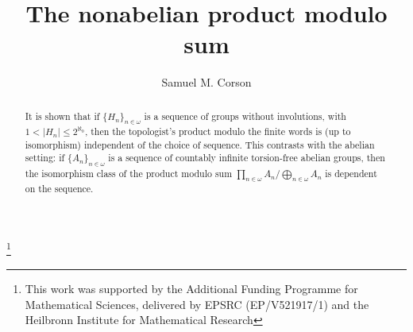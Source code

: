 \documentclass{amsart}
\title{The nonabelian product modulo sum}
\author{Samuel M. Corson}
\theoremstyle{definition}\newtheorem{theorem}{Theorem}
\theoremstyle{definition}\newtheorem*{A}{Main Theorem}
\theoremstyle{definition}\newtheorem*{B}{Theorem \ref{elementaryequiv}}
\theoremstyle{definition}\newtheorem*{C}{Theorem \ref{continuous}}
\theoremstyle{definition}\newtheorem*{D}{Theorem \ref{bigisomorphism2}}
\theoremstyle{definition}\newtheorem{bigtheorem}{Main Theorem}
\numberwithin{theorem}{section}
\theoremstyle{definition}\newtheorem{corollary}[theorem]{Corollary}
\theoremstyle{definition}\newtheorem{proposition}[theorem]{Proposition}
\theoremstyle{definition}\newtheorem{definition}[theorem]{Definition}
\theoremstyle{definition}\newtheorem{question}[theorem]{Question}
\theoremstyle{definition}\newtheorem{example}[theorem]{Example}
\theoremstyle{definition}\newtheorem{remark}[theorem]{Remark}
\theoremstyle{definition}\newtheorem{note}[theorem]{Note}
\theoremstyle{definition}\newtheorem{lemma}[theorem]{Lemma}
\theoremstyle{definition}\newtheorem{fact}[theorem]{Fact}
\theoremstyle{definition}\newtheorem{define}[theorem]{Definition}
\theoremstyle{definition}\newtheorem{claim}[theorem]{Claim}
\theoremstyle{definition}\newtheorem{obs}[theorem]{Observation}
\theoremstyle{definition}\newtheorem{definitions}[theorem]{Definitions}
\begin{document}
\address{School of Mathematics, University of Bristol, Fry Building, Woodland Road, Bristol, BS8 1UG, United Kingdom.}

\thanks{This
work was supported by the Additional Funding Programme for Mathematical
Sciences, delivered by EPSRC (EP/V521917/1) and the Heilbronn Institute
for Mathematical Research}


\begin{abstract}  It is shown that if $\{H_n\}_{n \in \omega}$ is a sequence of groups without involutions, with $1 < |H_n| \leq 2^{\aleph_0}$, then the topologist's product modulo the finite words is (up to isomorphism) independent of the choice of sequence.  This contrasts with the abelian setting: if $\{A_n\}_{n \in \omega}$ is a sequence of countably infinite torsion-free abelian groups, then the isomorphism class of the product modulo sum $\prod_{n \in \omega} A_n/\bigoplus_{n \in \omega} A_n$ is dependent on the sequence.  


\end{abstract}

\maketitle
\end{document}
